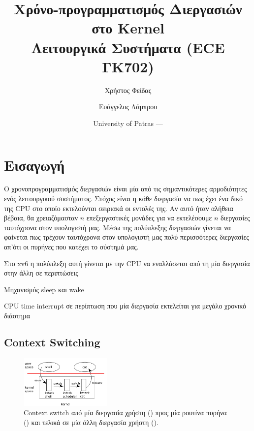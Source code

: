 \documentclass[18pt]{extarticle}
\title{Χρόνο-προγραμματισμός Διεργασιών στο \src{xv6} Kernel \\Λειτουργικά Συστήματα (ECE ΓΚ702)} %
\author{\footnotesize Χρήστος Φείδας\\ \footnotesize \src{fidas@upatras.gr} \and \footnotesize Ευάγγελος Λάμπρου\\ \footnotesize \src{e.lamprou@upnet.gr}} %
\date{University of Patras --- \the\year{}} %
\begin{document}
\pagestyle{fancy}
\fancyhf{} %
\renewcommand{\headrulewidth}{0pt}
\fancyhead{} %
\fancyfoot{} %
\fancyfoot[R]{\thepage}

\maketitle

\tableofcontents


\section{Εισαγωγή}

Ο χρονοπρογραμματισμός διεργασιών είναι μία από τις σημαντικότερες 
αρμοδιότητες ενός λειτουργικού συστήματος.
Στόχος είναι η κάθε διεργασία να  πως έχει ένα 
δικό της CPU στο οποίο εκτελούνται σειριακά οι εντολές της.
Αν αυτό ήταν αλήθεια βέβαια, θα χρειαζόμασταν $n$ επεξεργαστικές μονάδες 
για να εκτελέσουμε $n$ διεργασίες ταυτόχρονα στον υπολογιστή μας. 
Μέσω της πολύπλεξης διεργασιών γίνεται να φαίνεται πως τρέχουν ταυτόχρονα στον υπολογιστή μας
πολύ περισσότερες διεργασίες απ'ότι οι πυρήνες που κατέχει το σύστημά μας.

Στο xv6 η πολύπλεξη αυτή γίνεται με την CPU να εναλλάσεται από τη μία διεργασία
στην άλλη σε περιπτώσεις
\begin{enumerate*}
    \item Μηχανισμός sleep και wake %
    \item CPU time interrupt σε περίπτωση που μία διεργασία εκτελείται για μεγάλο χρονικό διάστημα
\end{enumerate*}

\subsection{Context Switching}

\begin{figure}[H]
    \centering
    \includegraphics[width=0.4\textwidth]{assets/sched/switch.png}
    \caption{Context switch από μία διεργασία χρήστη () 
    προς μία ρουτίνα πυρήνα () και τελικά 
    σε μία άλλη διεργασία χρήστη ().}
\end{figure}
\end{document}
